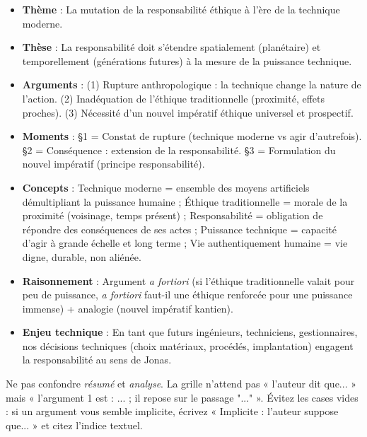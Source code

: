 \documentclass[11pt]{article}
\newcommand{\cle}[1]{{\popxbold\color{popdark}#1}}
\begin{document}
\begin{aretenir}
\begin{itemize}
\item \textbf{Thème} : La mutation de la responsabilité éthique à l'ère de la technique moderne.
\item \textbf{Thèse} : La responsabilité doit s'étendre spatialement (planétaire) et temporellement (générations futures) à la mesure de la puissance technique.
\item \textbf{Arguments} : (1) Rupture anthropologique : la technique change la nature de l'action. (2) Inadéquation de l'éthique traditionnelle (proximité, effets proches). (3) Nécessité d'un nouvel impératif éthique universel et prospectif.
\item \textbf{Moments} : §1 = Constat de rupture (technique moderne vs agir d'autrefois). §2 = Conséquence : extension de la responsabilité. §3 = Formulation du nouvel impératif (principe responsabilité).
\item \textbf{Concepts} : \cle{Technique moderne} = ensemble des moyens artificiels démultipliant la puissance humaine ; \cle{Éthique traditionnelle} = morale de la proximité (voisinage, temps présent) ; \cle{Responsabilité} = obligation de répondre des conséquences de ses actes ; \cle{Puissance technique} = capacité d'agir à grande échelle et long terme ; \cle{Vie authentiquement humaine} = vie digne, durable, non aliénée.
\item \textbf{Raisonnement} : Argument \emph{a fortiori} (si l'éthique traditionnelle valait pour peu de puissance, \emph{a fortiori} faut-il une éthique renforcée pour une puissance immense) + analogie (nouvel impératif kantien).
\item \textbf{Enjeu technique} : En tant que futurs ingénieurs, techniciens, gestionnaires, nos décisions techniques (choix matériaux, procédés, implantation) engagent la responsabilité au sens de Jonas.
\end{itemize}
\end{aretenir}

\begin{attention}
Ne pas confondre \emph{résumé} et \emph{analyse}. La grille n'attend pas « l'auteur dit que... » mais « l'argument 1 est : ... ; il repose sur le passage "..." ». Évitez les cases vides : si un argument vous semble implicite, écrivez « Implicite : l'auteur suppose que... » et citez l'indice textuel.
\end{attention}
\end{document}
